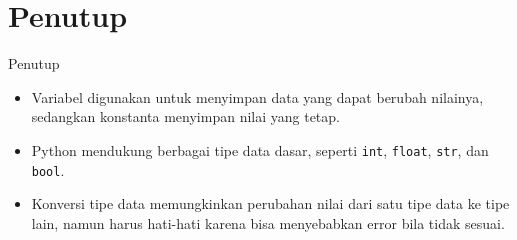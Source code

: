 \documentclass[aspectratio=169, table]{beamer}
\begin{document}
\section{Penutup}
\begin{frame}[fragile]{Penutup}
\begin{itemize}
    \item Variabel digunakan untuk menyimpan data yang dapat berubah nilainya, sedangkan konstanta menyimpan nilai yang tetap.
    \item Python mendukung berbagai tipe data dasar, seperti \texttt{int}, \texttt{float}, \texttt{str}, dan \texttt{bool}.
    \item Konversi tipe data memungkinkan perubahan nilai dari satu tipe data ke tipe lain, namun harus hati-hati karena bisa menyebabkan error bila tidak sesuai.
\end{itemize}
\end{frame}
\end{document}
